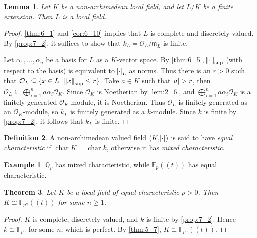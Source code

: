 \documentclass[11pt]{article}
\theoremstyle{definition}
\newtheorem{definition}{Definition}[subsection]
\newtheorem*{example}{Example}
\theoremstyle{plain}
\newtheorem{theorem}[definition]{Theorem}
\newtheorem{lemma}[definition]{Lemma}
\theoremstyle{remark}
\DeclareMathOperator{\Char}{char}
\newcommand{\FF}{\mathbb{F}}
\newcommand{\QQ}{\mathbb{Q}}
\newcommand{\cO}{\mathcal{O}}
\newcommand{\fm}{\mathfrak{m}}
\begin{document}
\begin{lemma}\label{lem:7_5}
    Let $K$ be a non-archimedean local field, and let $L/K$ be a finite extension. Then $L$ is a local field.
\end{lemma}
\begin{proof}
    \autoref{thm:6_1} and \autoref{cor:6_10} implies that $L$ is complete and discretely valued. By \autoref{prop:7_2}, it suffices to show that $k_L = \cO_L / \fm_L$ is finite.

    Let $\alpha_1, \ldots, \alpha_n$ be a basis for $L$ as a $K$-vector space. By \autoref{thm:6_5}, $\norm{\cdot}_\mathrm{sup}$ (with respect to the basis) is equivalent to $\abs{\cdot}_L$ as norms. Thus there is an $r > 0$ such that $\cO_L \subseteq \{x \in L \mid \norm{x}_\mathrm{sup} \le r\}$. Take $a \in K$ such that $\abs{a} > r$, then $\cO_L \subseteq \bigoplus_{i=1}^n a \alpha_i \cO_K$. Since $\cO_K$ is Noetherian by \autoref{lem:2_6}, and $\bigoplus_{i=1}^n a \alpha_i \cO_K$ is a finitely generated $\cO_K$-module, it is Noetherian. Thus $\cO_L$ is finitely generated as an $\cO_K$-module, so $k_L$ is finitely generated as a $k$-module. Since $k$ is finite by \autoref{prop:7_2}, it follows that $k_L$ is finite.
\end{proof}


\begin{definition}\label{def:7_7}
    A non-archimedean valued field $(K, \abs{\cdot})$ is said to have \emph{equal characteristic} if $\Char{K} = \Char{k}$, otherwise it has \emph{mixed characteristic}.
\end{definition}

\begin{example}
    $\QQ_p$ has mixed characteristic, while $\FF_p((t))$ has equal characteristic.
\end{example}

\begin{theorem}\label{thm:7_8}
    Let $K$ be a local field of equal characteristic $p > 0$. Then $K \cong \FF_{p^n}((t))$ for some $n \ge 1$.
\end{theorem}
\begin{proof}
    $K$ is complete, discretely valued, and $k$ is finite by \autoref{prop:7_2}. Hence $k \cong \FF_{p^n}$ for some $n$, which is perfect. By \autoref{thm:5_7}, $K \cong \FF_{p^n}((t))$.
\end{proof}
\end{document}
